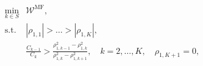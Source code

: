 \documentclass[final,3p,times,11pt]{elsarticle}
\newcommand{\JLcolor}[1]{{\textcolor{violet}{#1}}} %
\begin{document}
\begin{equation*}\label{eq:Optimization_pb_model_selection}
    \begin{array}{lll}
    \displaystyle\min_{k\in S} &\displaystyle \mathcal{W}^\text{MF},\\
       \text{s.t.} &\displaystyle |\rho_{1,1}|>\ldots>|\rho_{1,K}|,\\
       &\displaystyle \frac{C_{k-1}}{C_k}>\frac{\rho_{1,k-1}^2-\rho_{1,k}^2}{\rho_{1,k}^2-\rho_{1,k+1}^2}, \quad k=2,\ldots,K, \quad \rho_{1,K+1}=0,\\
    \end{array}
\end{equation*}
\end{document}
